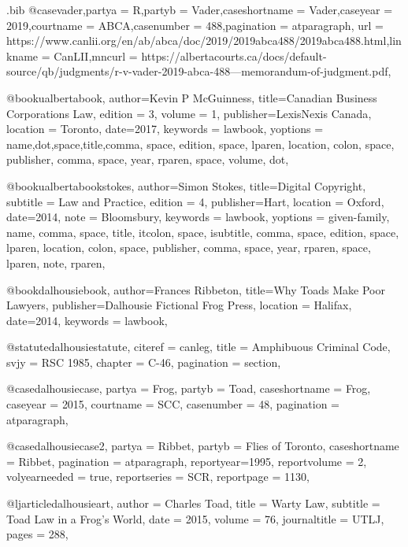 \begin{filecontents*}[overwrite]{\jobname.bib}
@case{vader,partya =  {R},partyb =  {Vader},caseshortname =  {Vader},caseyear =  {2019},courtname =  {ABCA},casenumber =  {488},pagination =  {atparagraph}, url =  {https://www.canlii.org/en/ab/abca/doc/2019/2019abca488/2019abca488.html},linkname =  {CanLII},mncurl =  {https://albertacourts.ca/docs/default-source/qb/judgments/r-v-vader-2019-abca-488---memorandum-of-judgment.pdf},}


@book{ualbertabook,
author={Kevin P McGuinness},
title={Canadian Business Corporations Law},
edition = {3},
volume = {1},
publisher={LexisNexis Canada},
location = {Toronto},
date={2017},
keywords = {lawbook},
yoptions = {name,dot,space,title,comma,
space,
edition,
space,
lparen, 
location,
colon,
space,
publisher,
comma,
space,
year,
rparen,
space,
volume,
dot},
}



@book{ualbertabookstokes,
author={Simon Stokes},
title={Digital Copyright},
subtitle = {Law and Practice},
edition = {4},
publisher={Hart},
location = {Oxford},
date={2014},
note = {Bloomsbury},
keywords = {lawbook},
yoptions = {given-family,
name,
comma,
space,
title,
itcolon,
space,
isubtitle,
comma,
space,
edition,
space,
lparen, 
location,
colon,
space,
publisher,
comma,
space,
year,
rparen,
space,
lparen,
note,
rparen},
}




@book{dalhousiebook,
author={Frances Ribbeton},
title={Why Toads Make Poor Lawyers},
publisher={Dalhousie Fictional Frog Press},
location = {Halifax},
date={2014},
keywords = {lawbook},
}

@statute{dalhousiestatute,
citeref = {canleg},
title = {Amphibuous Criminal Code},
svjy = {RSC 1985},
chapter = {C-46},
pagination = {section},
}

@case{dalhousiecase,
  partya = {Frog}, 
  partyb = {Toad},
  caseshortname = {Frog},
  caseyear = {2015},
  courtname = {SCC},
  casenumber = {48},
  pagination = {atparagraph},
}

@case{dalhousiecase2,
  partya = {Ribbet}, 
  partyb = {Flies of Toronto},
  caseshortname = {Ribbet},
  pagination = {atparagraph},
  reportyear={1995},
  reportvolume = {2},
  volyearneeded = {true},
  reportseries = {SCR},
  reportpage = {1130},
}


@ljarticle{dalhousieart,
author = {Charles Toad},
title = {Warty Law},
subtitle = {Toad Law in a Frog's World},
date = {2015},
volume = {76},
journaltitle = {UTLJ},
pages = {288},
}




\end{filecontents*}
